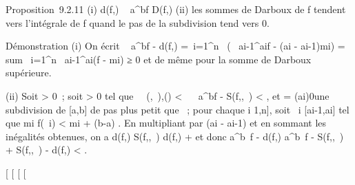 Proposition~9.2.11 (i) d(f,\sigma) \leq\int ~
a^bf \leq D(f,\sigma) (ii) les sommes de Darboux de f tendent
vers l'intégrale de f quand le pas de la subdivision tend vers 0.

Démonstration (i) On écrit \int ~
a^bf - d(f,\sigma) =\
\sum  i=1^n~\left
(\int ~
ai-1^aif - (ai -
ai-1)mi\right )
= \\sum~
i=1^n\int ~
ai-1^ai(f - mi) ≥ 0 et de
même pour la somme de Darboux supérieure.

(ii) Soit \epsilon \textgreater{} 0~; soit \eta \textgreater{} 0 tel que
\forall~~(\sigma,\xi~),\quad \delta(\sigma) \textless{} \eta
\rigtharrow~\left \textbar{}\int ~
a^bf - S(f,\sigma,\xi~)\right \textbar{}
\textless{} \epsilon {} , et \sigma =
(ai)0\leqi\leqn une subdivision de {[}a,b{]} de pas plus
petit que \eta~; pour chaque i \in {[}1,n{]}, soit \xi~i \in
{[}ai-1,ai{]} tel que mi \leq f(\xi~i)
\textless{} mi + \epsilon {}(b-a) . En
multipliant par (ai - ai-1) et en sommant les
inégalités obtenues, on a d(f,\sigma) \leq S(f,\sigma,\xi~) \leq d(f,\sigma) + \epsilon
\over 2 et donc \left
\textbar{}\int  a^b~f -
d(f,\sigma)\right \textbar{}\leq\left
\textbar{}\int  a^b~f -
S(f,\sigma,\xi~)\right \textbar{} + \textbar{}S(f,\sigma,\xi~) -
d(f,\sigma)\textbar{} \textless{} \epsilon.

{[}
{[}
{[}
{[}

